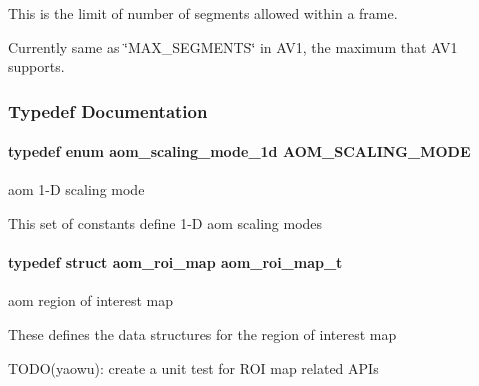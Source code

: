 This is the limit of number of segments allowed within a frame.

Currently same as \char`\"{}\+M\+A\+X\+\_\+\+S\+E\+G\+M\+E\+N\+T\+S\char`\"{} in A\+V1, the maximum that A\+V1 supports. 

\subsubsection{Typedef Documentation}
\paragraph[{\texorpdfstring{A\+O\+M\+\_\+\+S\+C\+A\+L\+I\+N\+G\+\_\+\+M\+O\+DE}{AOM_SCALING_MODE}}]{\setlength{\rightskip}{0pt plus 5cm}typedef enum {\bf aom\+\_\+scaling\+\_\+mode\+\_\+1d}  {\bf A\+O\+M\+\_\+\+S\+C\+A\+L\+I\+N\+G\+\_\+\+M\+O\+DE}}\hypertarget{group__aom__encoder_ga6694eedd50b128415a3434404c56d73d}{}\label{group__aom__encoder_ga6694eedd50b128415a3434404c56d73d}


aom 1-\/D scaling mode 

This set of constants define 1-\/D aom scaling modes 
\paragraph[{\texorpdfstring{aom\+\_\+roi\+\_\+map\+\_\+t}{aom_roi_map_t}}]{\setlength{\rightskip}{0pt plus 5cm}typedef struct {\bf aom\+\_\+roi\+\_\+map}  {\bf aom\+\_\+roi\+\_\+map\+\_\+t}}\hypertarget{group__aom__encoder_gae682e0031e08270a2e0a60928305a830}{}\label{group__aom__encoder_gae682e0031e08270a2e0a60928305a830}


aom region of interest map 

These defines the data structures for the region of interest map

T\+O\+D\+O(yaowu)\+: create a unit test for R\+OI map related A\+P\+Is 
